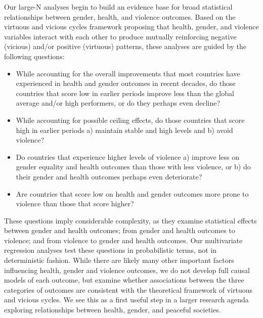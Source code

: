 \documentclass[12pt]{article}
\begin{document}
Our large-N analyses begin to build an evidence base for broad statistical relationships between gender, health, and violence outcomes.
Based on the virtuous and vicious cycles framework proposing that health, gender, and violence variables interact with each other to produce mutually reinforcing negative (vicious) and/or positive (virtuous) patterns, these analyses are guided by the following questions:
\begin{itemize}
\item While accounting for the overall improvements that most countries have experienced in health and gender outcomes in recent decades, do those countries that score low in earlier periods improve less than the global average and/or high performers, or do they perhaps even decline?
\item While accounting for possible ceiling effects, do those countries that score high in earlier periods a) maintain stable and high levels and b) avoid violence?
\item Do countries that experience higher levels of violence a) improve less on gender equality and health outcomes than those with less violence, or b) do their gender and health outcomes perhaps even deteriorate?
\item Are countries that score low on health and gender outcomes more prone to violence than those that score higher?
\end{itemize}

These questions imply considerable complexity, as they examine statistical effects between gender and health outcomes; from gender and health outcomes to violence; and from violence to gender and health outcomes.
Our multivariate regression analyses test these questions in probabilistic terms, not in deterministic fashion.
While there are likely many other important factors influencing health, gender and violence outcomes, we do not develop full causal models of each outcome, but examine whether associations between the three categories of outcomes are consistent with the theoretical framework of virtuous and vicious cycles. We see this as a first useful step in a larger research agenda exploring relationships between health, gender, and peaceful societies.
\end{document}
